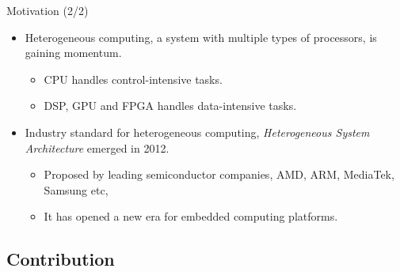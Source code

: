 \documentclass{beamer}
\begin{document}
\begin{CJK}{UTF8}{bkai}
    \begin{frame}{Motivation (2/2)}
        \begin{itemize}
            \item {
                    Heterogeneous computing, a system with multiple types of processors, is gaining momentum.
                    \begin{itemize}
                        \item {
                                CPU handles control-intensive tasks.
                            }
                        \item {
                                DSP, GPU and FPGA handles data-intensive tasks.
                            }
                        \end{itemize}
                }
            \item {
                    Industry standard for heterogeneous computing, \textit{Heterogeneous System Architecture} emerged in 2012.
                    \begin{itemize}
                        \item {
                                Proposed by leading semiconductor companies, AMD, ARM, MediaTek, Samsung etc, 
                            }
                        \item {
                                It has opened a new era for embedded computing platforms.
                            }
                        \end{itemize}
                }
        \end{itemize}
    \end{frame}


    \subsection{Contribution}


\end{CJK}
\end{document}
